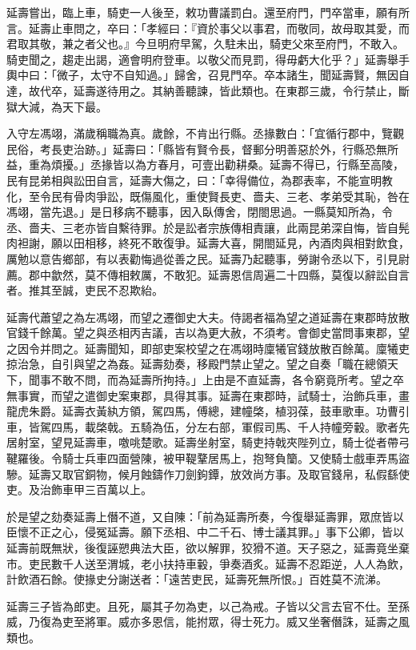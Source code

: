 \begin{pinyinscope}
延壽嘗出，臨上車，騎吏一人後至，敕功曹議罰白。還至府門，門卒當車，願有所言。延壽止車問之，卒曰：「孝經曰：『資於事父以事君，而敬同，故母取其愛，而君取其敬，兼之者父也。』今旦明府早駕，久駐未出，騎吏父來至府門，不敢入。騎吏聞之，趨走出謁，適會明府登車。以敬父而見罰，得毋虧大化乎？」延壽舉手輿中曰：「微子，太守不自知過。」歸舍，召見門卒。卒本諸生，聞延壽賢，無因自達，故代卒，延壽遂待用之。其納善聽諫，皆此類也。在東郡三歲，令行禁止，斷獄大減，為天下最。

入守左馮翊，滿歲稱職為真。歲餘，不肯出行縣。丞掾數白：「宜循行郡中，覽觀民俗，考長吏治跡。」延壽曰：「縣皆有賢令長，督郵分明善惡於外，行縣恐無所益，重為煩擾。」丞掾皆以為方春月，可壹出勸耕桑。延壽不得已，行縣至高陵，民有昆弟相與訟田自言，延壽大傷之，曰：「幸得備位，為郡表率，不能宣明教化，至令民有骨肉爭訟，既傷風化，重使賢長吏、嗇夫、三老、孝弟受其恥，咎在馮翊，當先退。」是日移病不聽事，因入臥傳舍，閉閤思過。一縣莫知所為，令丞、嗇夫、三老亦皆自繫待罪。於是訟者宗族傳相責讓，此兩昆弟深自悔，皆自髡肉袒謝，願以田相移，終死不敢復爭。延壽大喜，開閤延見，內酒肉與相對飲食，厲勉以意告鄉部，有以表勸悔過從善之民。延壽乃起聽事，勞謝令丞以下，引見尉薦。郡中歙然，莫不傳相敕厲，不敢犯。延壽恩信周遍二十四縣，莫復以辭訟自言者。推其至誠，吏民不忍欺紿。

延壽代蕭望之為左馮翊，而望之遷御史大夫。侍謁者福為望之道延壽在東郡時放散官錢千餘萬。望之與丞相丙吉議，吉以為更大赦，不須考。會御史當問事東郡，望之因令并問之。延壽聞知，即部吏案校望之在馮翊時廩犧官錢放散百餘萬。廩犧吏掠治急，自引與望之為姦。延壽劾奏，移殿門禁止望之。望之自奏「職在總領天下，聞事不敢不問，而為延壽所拘持。」上由是不直延壽，各令窮竟所考。望之卒無事實，而望之遣御史案東郡，具得其事。延壽在東郡時，試騎士，治飾兵車，畫龍虎朱爵。延壽衣黃紈方領，駕四馬，傅總，建幢棨，植羽葆，鼓車歌車。功曹引車，皆駕四馬，載棨戟。五騎為伍，分左右部，軍假司馬、千人持幢旁轂。歌者先居射室，望見延壽車，噭咷楚歌。延壽坐射室，騎吏持戟夾陛列立，騎士從者帶弓鞬羅後。令騎士兵車四面營陳，被甲鞮鞪居馬上，抱弩負籣。又使騎士戲車弄馬盜驂。延壽又取官銅物，候月蝕鑄作刀劍鉤鐔，放效尚方事。及取官錢帛，私假繇使吏。及治飾車甲三百萬以上。

於是望之劾奏延壽上僭不道，又自陳：「前為延壽所奏，今復舉延壽罪，眾庶皆以臣懷不正之心，侵冤延壽。願下丞相、中二千石、博士議其罪。」事下公卿，皆以延壽前既無狀，後復誣愬典法大臣，欲以解罪，狡猾不道。天子惡之，延壽竟坐棄市。吏民數千人送至渭城，老小扶持車轂，爭奏酒炙。延壽不忍距逆，人人為飲，計飲酒石餘。使掾史分謝送者：「遠苦吏民，延壽死無所恨。」百姓莫不流涕。

延壽三子皆為郎吏。且死，屬其子勿為吏，以己為戒。子皆以父言去官不仕。至孫威，乃復為吏至將軍。威亦多恩信，能拊眾，得士死力。威又坐奢僭誅，延壽之風類也。


\end{pinyinscope}
